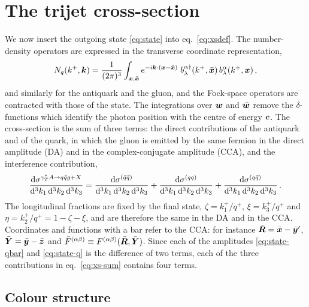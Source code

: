 \section{The trijet cross-section}
\label{sec:xs}

We now insert the outgoing state \eqref{eq:state} into eq.~\eqref{eq:xsdef}. The number-density
operators are expressed in the transverse coordinate representation,
\begin{equation}
N_q(k^+,\bm{k})=\frac{1}{(2\pi)^3}\int_{\bm{x},\bar{\bm{x}}}e^{-i\bm{k}\cdot(\bm{x}-\bar{\bm{x}})}\;
b^{\alpha\dagger}_\lambda(k^+,\bar{\bm{x}})\,b^{\alpha}_\lambda(k^+,\bm{x})\,,
\end{equation}
and similarly for the antiquark and the gluon, and the Fock-space operators are contracted with those
of the state. The integrations over $\bm{w}$ and $\bar{\bm{w}}$ remove the $\delta$-functions which identify the
photon position with the centre of energy $\bm{c}$. The cross-section is the sum of three terms: the
direct contributions of the antiquark and of the quark, in which the gluon is emitted by the same
fermion in the direct amplitude (DA) and in the complex-conjugate amplitude (CCA), and the
interference contribution,
\begin{equation}
\frac{{\rm d}\sigma^{\gamma^{*}_{T} A\to q\bar q g+X}}{{\rm d}^3k_1\,{\rm d}^3k_2\,{\rm d}^3k_3}
=\frac{{\rm d}\sigma^{(\bar q\bar q)}}{{\rm d}^3k_1\,{\rm d}^3k_2\,{\rm d}^3k_3}
+\frac{{\rm d}\sigma^{(qq)}}{{\rm d}^3k_1\,{\rm d}^3k_2\,{\rm d}^3k_3}
+\frac{{\rm d}\sigma^{(q\bar q)}}{{\rm d}^3k_1\,{\rm d}^3k_2\,{\rm d}^3k_3}\,.
\label{eq:xs-sum}
\end{equation}
The longitudinal fractions are fixed by the final state, $\zeta=k_1^+/q^+$, $\xi=k_3^+/q^+$ and
$\eta=k_2^+/q^+=1-\zeta-\xi$, and are therefore the same in the DA and in the CCA. Coordinates and
functions with a bar refer to the CCA: for instance $\bar{\bm{R}}=\bar{\bm{x}}-\bar{\bm{y}}'$, $\bar{\bm{Y}}=\bar{\bm{y}}-\bar{\bm{z}}$ and
$\bar F^{(\alpha\beta)}\equiv F^{(\alpha\beta)}(\bar{\bm{R}},\bar{\bm{Y}})$. Since each of the amplitudes
\eqref{eq:state-qbar} and \eqref{eq:state-q} is the difference of two terms, each of the three
contributions in eq.~\eqref{eq:xs-sum} contains four terms.

\subsection{Colour structure}
\label{sec:colour}

